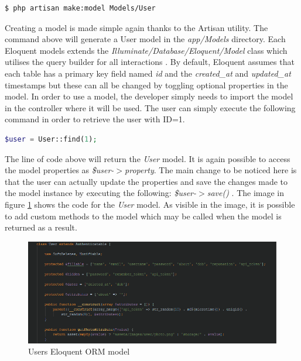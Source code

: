 \begin{lstlisting}[language=bash]
    $ php artisan make:model Models/User
\end{lstlisting}

Creating a model is made simple again thanks to the Artisan utility. The command above will generate a User model in the \emph{app/Models} directory. Each Eloquent models extends the \emph{Illuminate/Database/Eloquent/Model} class which utilises the query builder for all interactions \cite{Laravel:Eloquent}. By default, Eloquent assumes that each table has a primary key field named \emph{id} and the \emph{created\_at} and \emph{updated\_at} timestamps but these can all be changed by toggling optional properties in the model. In order to use a model, the developer simply needs to import the model in the controller where it will be used. The user can simply execute the following command in order to retrieve the user with ID=1.

\begin{lstlisting}[language=php]
    $user = User::find(1);
\end{lstlisting}

The line of code above will return the \emph{User} model. It is again possible to access the model properties as \emph{\$user-$>$property}. The main change to be noticed here is that the user can actually update the properties and save the changes made to the model instance by executing the following: \emph{\$user-$>$save()} \cite{Laravel:Eloquent}.  The image in figure \ref{fig:UserModel} shows the code for the \emph{User} model. As visible in the image, it is possible to add custom methods to the model which may be called when the model is returned as a result.

\begin{figure}[H]
    \centering
    \includegraphics[width=1.0\textwidth]{Images/Implementation/UserModel}
    \caption{Users Eloquent ORM model} \label{fig:UserModel}
\end{figure}